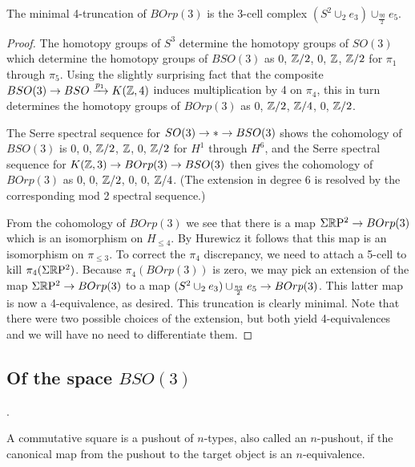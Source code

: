 \documentclass{amsart}
\begin{document}
\begin{proposition} \label{prop-borptrunc}
The minimal 4-truncation of $BOrp(3)$ is the 3-cell complex $(S^2 \cup_2 e_3) \cup_{\frac{\eta q}{2}} e_5$.
\end{proposition}
\begin{proof}
The homotopy groups of $S^3$ determine the homotopy groups of $SO(3)$ which determine the homotopy groups of $BSO(3)$ as $0$, $\mathbb Z/2$, $0$, $\mathbb Z$, $\mathbb Z/2$ for $\pi_1$ through $\pi_5$.  Using the slightly surprising fact that the composite $BSO(3) \rightarrow BSO \xrightarrow{p_1} K(\mathbb Z,4)$ induces multiplication by 4 on $\pi_4$, this in turn determines the homotopy groups of $BOrp(3)$ as $0$, $\mathbb Z/2$, $\mathbb Z/4$, $0$, $\mathbb Z/2$.  

The Serre spectral sequence for $SO(3) \rightarrow * \rightarrow BSO(3)$ shows the cohomology of $BSO(3)$ is $0$, $0$, $\mathbb Z/2$, $\mathbb Z$, $0$, $\mathbb Z/2$ for $H^1$ through $H^6$, and the Serre spectral sequence for $K(\mathbb Z,3) \rightarrow BOrp(3) \rightarrow BSO(3)$ then gives the cohomology of $BOrp(3)$ as $0$, $0$, $\mathbb Z/2$, $0$, $0$, $\mathbb Z/4$.  (The extension in degree 6 is resolved by the corresponding mod 2 spectral sequence.)

From the cohomology of $BOrp(3)$ we see that there is a map $\Sigma \mathbb R \mathrm{P}^2 \rightarrow BOrp(3)$ which is an isomorphism on $H_{\leq 4}$.  By Hurewicz it follows that this map is an isomorphism on $\pi_{\leq 3}$.  To correct the $\pi_4$ discrepancy, we need to attach a 5-cell to kill $\pi_4(\Sigma \mathbb R \mathrm{P}^2)$.  Because $\pi_4(BOrp(3))$ is zero, we may pick an extension of the map $\Sigma \mathbb R \mathrm{P}^2 \rightarrow BOrp(3)$ to a map $(S^2 \cup_2 e_3) \cup_{\frac{\eta q}{2}} e_5 \rightarrow BOrp(3)$.  This latter map is now a 4-equivalence, as desired.  This truncation is clearly minimal.  Note that there were two possible choices of the extension, but both yield 4-equivalences and we will have no need to differentiate them.
\end{proof}

\subsection{Of the space $BSO(3)$}.


\begin{definition}
A commutative square is a pushout of $n$-types, also called an $n$-pushout, if the canonical map from the pushout to the target object is an $n$-equivalence.
\end{definition}
\end{document}
